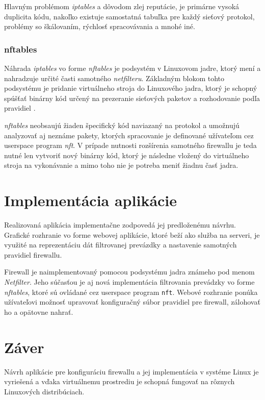 Hlavným problémom \emph{iptables} a dôvodom zlej reputácie, je primárne vysoká duplicita kódu, nakoľko existuje samostatná tabuľka pre každý sieťový protokol, problémy so škálovaním, rýchlosť spracovávania a mnohé iné.

\subsection{nftables}
\label{nftables}
Náhrada \emph{iptables} vo forme \emph{nftables} je podsystém v Linuxovom jadre, ktorý mení a nahradzuje určité časti samotného \emph{netfilteru}. Základným blokom tohto podsystému je pridanie virtuálneho stroja do Linuxového jadra, ktorý je schopný spúšťať binárny kód určený na prezeranie sieťových paketov a rozhodovanie podľa pravidiel \cite{manpages, netfilter}. 

                                                                                 
\emph{nftables} neobsaujú žiaden špecifický kód naviazaný na protokol a umožnujú analyzovať aj neznáme pakety, ktorých spracovanie je definované užívateľom cez userspace program \emph{nft}. V prípade nutnosti rozšírenia samotného firewallu je teda nutné len vytvoriť nový binárny kód, ktorý je následne vložený do virtuálneho stroja na vykonávanie a mimo toho nie je potreba meniť žiadnu časť jadra.



\chapter{Implementácia aplikácie}
Realizovaná aplikácia implementačne zodpovedá jej predloženému návrhu. Grafické rozhranie vo forme webovej aplikácie, ktoré beží ako služba na serveri, je využité na reprezentáciu dát filtrovanej prevázdky a nastavenie samotných pravidiel firewallu.

Firewall je naimplementovaný pomocou podsystému jadra známeho pod menom \emph{Netfilter}. Jeho súčasťou je aj nová implementácia filtrovania prevádzky vo forme \emph{nftables}, ktoré sú ovládané cez userspace program \texttt{nft}. Webové rozhranie ponúka užívateľovi možnosť upravovať konfiguračný súbor pravidiel pre firewall, zálohovať ho a opätovne nahrať. 

\chapter*{Záver}

Návrh aplikácie pre konfiguráciu firewallu a jej implementácia v systéme Linux je vyriešená a vďaka virtuálnemu prostrediu je schopná fungovať na rôznych Linuxových distribúciach. 

